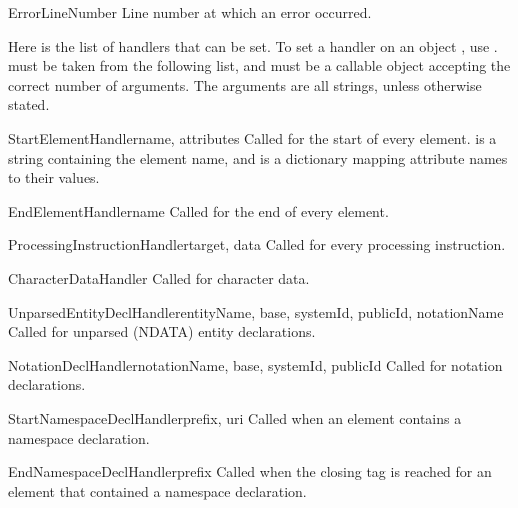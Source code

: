 \begin{datadesc}{ErrorLineNumber}
Line number at which an error occurred.
\end{datadesc}

Here is the list of handlers that can be set.  To set a handler on an
 object , use
.   must
be taken from the following list, and  must be a callable
object accepting the correct number of arguments.  The arguments are
all strings, unless otherwise stated.

\begin{methoddesc}{StartElementHandler}{name, attributes}
Called for the start of every element.   is a string
containing the element name, and  is a dictionary
mapping attribute names to their values.
\end{methoddesc}

\begin{methoddesc}{EndElementHandler}{name}
Called for the end of every element.
\end{methoddesc}

\begin{methoddesc}{ProcessingInstructionHandler}{target, data}
Called for every processing instruction.  
\end{methoddesc}

\begin{methoddesc}{CharacterDataHandler}{}
Called for character data.  
\end{methoddesc}

\begin{methoddesc}{UnparsedEntityDeclHandler}{entityName, base, systemId, publicId, notationName}
Called for unparsed (NDATA) entity declarations.
\end{methoddesc}

\begin{methoddesc}{NotationDeclHandler}{notationName, base, systemId, publicId}
Called for notation declarations.
\end{methoddesc}

\begin{methoddesc}{StartNamespaceDeclHandler}{prefix, uri}
Called when an element contains a namespace declaration.
\end{methoddesc}

\begin{methoddesc}{EndNamespaceDeclHandler}{prefix}
Called when the closing tag is reached for an element 
that contained a namespace declaration.
\end{methoddesc}

